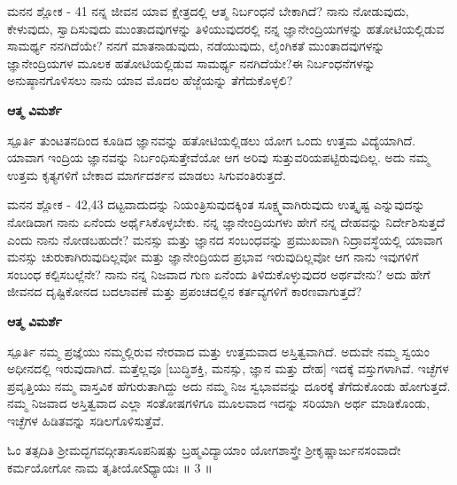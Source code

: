 \newpage
\begin{mananam}{\mananamfont ಮನನ ಶ್ಲೋಕ - \textenglish{41}}
\footnotesize \mananamtext ನನ್ನ ಜೀವನ ಯಾವ ಕ್ಷೇತ್ರದಲ್ಲಿ ಆತ್ಮ ನಿರ್ಬಂಧನೆ ಬೇಕಾಗಿದೆ? ನಾನು ನೋಡುವುದು, ಕೇಳುವುದು, ಸ್ವಾದಿಸುವುದು ಮುಂತಾದವುಗಳನ್ನು ತಿಳಿಯುವುದರಲ್ಲಿ ನನ್ನ ಜ್ಞಾನೇಂದ್ರಿಯಗಳನ್ನು ಹತೋಟಿಯಲ್ಲಿಡುವ ಸಾಮರ್ಥ್ಯ ನನಗಿದೆಯೇ? ನನಗೆ ಮಾತನಾಡುವುದು, ನಡೆಯುವುದು, ಲೈಂಗಿಕತೆ ಮುಂತಾದವುಗಳನ್ನು ಜ್ಞಾನೇಂದ್ರಿಯಗಳ ಮೂಲಕ ಹತೋಟಿಯಲ್ಲಿಡುವ ಸಾಮರ್ಥ್ಯ ನನಗಿದೆಯೇ?ಈ ನಿರ್ಬಂಧನೆಗಳನ್ನು ಅನುಷ್ಠಾನಗೊಳಿಸಲು ನಾನು ಯಾವ ಮೊದಲ ಹೆಜ್ಜೆಯನ್ನು ತೆಗೆದುಕೊಳ್ಳಲಿ?
\end{mananam}
\WritingHand\enspace\textbf{ಆತ್ಮ ವಿಮರ್ಶೆ}\\
\begin{inspiration}{\mananamfont ಸ್ಪೂರ್ತಿ}
\footnotesize \mananamtext ತುಂಟತನದಿಂದ ಕೂಡಿದ ಜ್ಞಾನವನ್ನು ಹತೋಟಿಯಲ್ಲಿಡಲು ಯೋಗ ಒಂದು ಉತ್ತಮ ವಿದ್ಯೆಯಾಗಿದೆ. ಯಾವಾಗ ಇಂದ್ರಿಯ ಜ್ಞಾನವನ್ನು ನಿರ್ಬಂಧಿಸುತ್ತೇವೆಯೋ ಆಗ ಅರಿವು ಸುತ್ತುವರಿಯಪಟ್ಟಿರುವುದಿಲ್ಲ. ಅದು ನಮ್ಮ ಉತ್ತಮ  ಕೃತ್ಯಗಳಿಗೆ ಬೇಕಾದ ಮಾರ್ಗದರ್ಶನ ಮಾಡಲು ಸಿಗುವಂತಿರುತ್ತದೆ.
\end{inspiration}
\newpage


\newpage
\begin{mananam}{\mananamfont ಮನನ ಶ್ಲೋಕ - \textenglish{42,43}}
\footnotesize \mananamtext ದಟ್ಟವಾದುದನ್ನು ನಿಯಂತ್ರಿಸುವುದಕ್ಕಿಂತ ಸೂಕ್ಷ್ಮವಾಗಿರುವುದು ಉತ್ಕೃಷ್ಟ ಎನ್ನುವುದನ್ನು ನೋಡಿದಾಗ ನಾನು ಏನೆಂದು ಅರ್ಥೈಸಿಕೊಳ್ಳಬೇಕು. ನನ್ನ ಜ್ಞಾನೇಂದ್ರಿಯಗಳು ಹೇಗೆ ನನ್ನ ದೇಹವನ್ನು ನಿರ್ದೇಶಿಸುತ್ತದೆ ಎಂದು ನಾನು ನೋಡಬಹುದೇ? ಮನಸ್ಸು ಮತ್ತು ಜ್ಞಾನದ ಸಂಬಂಧವನ್ನು ಪ್ರಮುಖವಾಗಿ ನಿದ್ರಾವಸ್ಥೆಯಲ್ಲಿ ಯಾವಾಗ ಮನಸ್ಸು ಚುರುಕಾಗಿರುವುದಿಲ್ಲವೋ ಮತ್ತು ಜ್ಞಾನೇಂದ್ರಿಯದ ಪ್ರಭಾವ  ಇರುವುದಿಲ್ಲವೋ ಆಗ ನಾನು ಇವುಗಳಿಗೆ ಸಂಬಂಧ ಕಲ್ಪಿಸಬಲ್ಲೆನೇ? ನಾನು ನನ್ನ ನಿಜವಾದ ಗುಣ ಏನೆಂದು ತಿಳಿದುಕೊಳ್ಳುವುದರ ಅರ್ಥವೇನು? ಅದು ಹೇಗೆ ಜೀವನದ ದೃಷ್ಟಿಕೋನದ ಬದಲಾವಣೆ ಮತ್ತು ಪ್ರಪಂಚದಲ್ಲಿನ ಕರ್ತವ್ಯಗಳಿಗೆ ಕಾರಣವಾಗುತ್ತದೆ?
\end{mananam}
\WritingHand\enspace\textbf{ಆತ್ಮ ವಿಮರ್ಶೆ}\\
\begin{inspiration}{\mananamfont ಸ್ಪೂರ್ತಿ}
\footnotesize \mananamtext ನಮ್ಮ ಪ್ರಜ್ಞೆಯು ನಮ್ಮಲ್ಲಿರುವ ನೇರವಾದ ಮತ್ತು ಉತ್ತಮವಾದ ಅಸ್ತಿತ್ವವಾಗಿದೆ. ಅದುವೇ ನಮ್ಮ ಸ್ವಯಂ ಅಧೀನದಲ್ಲಿ ಇರುವುದಾಗಿದೆ. ಮತ್ತೆಲ್ಲವೂ [ಬುದ್ಧಿಶಕ್ತಿ, ಮನಸ್ಸು, ಜ್ಞಾನ ಮತ್ತು ದೇಹ] ಇದಕ್ಕೆ ವಸ್ತುಗಳಾಗಿವೆ. ಇಚ್ಛೆಗಳ ಪ್ರವೃತ್ತಿಯು ನಮ್ಮ ವಾಸ್ತವಿಕ ಹೆಗುರುತಾಗಿದ್ದು ಅದು ನಮ್ಮ ನಿಜ ಸ್ವಭಾವವನ್ನು ದೂರಕ್ಕೆ ತೆಗೆದುಕೊಂಡು ಹೋಗುತ್ತದೆ. ನಮ್ಮ ನಿಜವಾದ ಅಸ್ತಿತ್ವವಾದ ಎಲ್ಲಾ ಸಂತೋಷಗಳಿಗೂ ಮೂಲವಾದ ಇದನ್ನು ಸರಿಯಾಗಿ ಅರ್ಥ ಮಾಡಿಕೊಂಡು, ಇಚ್ಛೆಗಳ ಹಿಡಿತವನ್ನು ಸಡಿಲಗೊಳಿಸುತ್ತೆವೆ.
\end{inspiration}
\newpage

\begin{center}
ಓಂ ತತ್ಸದಿತಿ ಶ್ರೀಮದ್ಭಗವದ್ಗೀತಾಸೂಪನಿಷತ್ಸು ಬ್ರಹ್ಮವಿದ್ಯಾಯಾಂ ಯೋಗಶಾಸ್ತ್ರೇ ಶ್ರೀಕೃಷ್ಣಾರ್ಜುನಸಂವಾದೇ\\
ಕರ್ಮಯೋಗೋ ನಾಮ ತೃತೀಯೋऽಧ್ಯಾಯಃ ॥ 3 ॥
\end{center}
